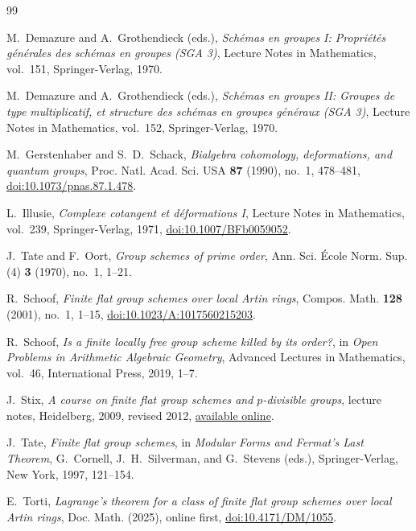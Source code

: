 \documentclass[11pt]{amsart}
\theoremstyle{definition}
\theoremstyle{remark}
\begin{document}
\begin{thebibliography}{99}

M.~Demazure and A.~Grothendieck (eds.),
\emph{Sch\'emas en groupes I: Propri\'et\'es g\'en\'erales des sch\'emas
en groupes (SGA 3)},
Lecture Notes in Mathematics, vol.~151, Springer-Verlag, 1970.

M.~Demazure and A.~Grothendieck (eds.),
\emph{Sch\'emas en groupes II: Groupes de type multiplicatif, et structure
des sch\'emas en groupes g\'en\'eraux (SGA 3)},
Lecture Notes in Mathematics, vol.~152, Springer-Verlag, 1970.

M.~Gerstenhaber and S.~D.~Schack,
\emph{Bialgebra cohomology, deformations, and quantum groups},
Proc. Natl. Acad. Sci. USA \textbf{87} (1990), no.~1, 478--481,
\href{https://doi.org/10.1073/pnas.87.1.478}
{doi:10.1073/pnas.87.1.478}.

L.~Illusie,
\emph{Complexe cotangent et d\'eformations I},
Lecture Notes in Mathematics, vol.~239, Springer-Verlag, 1971,
\href{https://doi.org/10.1007/BFb0059052}
{doi:10.1007/BFb0059052}.

J.~Tate and F.~Oort,
\emph{Group schemes of prime order},
Ann. Sci. \'Ecole Norm. Sup. (4) \textbf{3} (1970), no.~1, 1--21.

R.~Schoof,
\emph{Finite flat group schemes over local Artin rings},
Compos. Math. \textbf{128} (2001), no.~1, 1--15,
\href{https://doi.org/10.1023/A:1017560215203}{doi:10.1023/A:1017560215203}.

R.~Schoof,
\emph{Is a finite locally free group scheme killed by its order?},
in \emph{Open Problems in Arithmetic Algebraic Geometry},
Advanced Lectures in Mathematics, vol.~46, International Press, 2019,
1--7.

J.~Stix,
\emph{A course on finite flat group schemes and \(p\)-divisible groups},
lecture notes, Heidelberg, 2009, revised 2012,
\href{https://www.math.uni-frankfurt.de/~stix/skripte/STIXfinflatGrpschemes20120918.pdf}
{available online}.

J.~Tate,
\emph{Finite flat group schemes},
in \emph{Modular Forms and Fermat's Last Theorem},
G.~Cornell, J.~H.~Silverman, and G.~Stevens (eds.),
Springer-Verlag, New York, 1997, 121--154.

E.~Torti,
\emph{Lagrange's theorem for a class of finite flat group schemes over
local Artin rings},
Doc. Math. (2025), online first,
\href{https://doi.org/10.4171/DM/1055}{doi:10.4171/DM/1055}.

\end{thebibliography}
\end{document}
